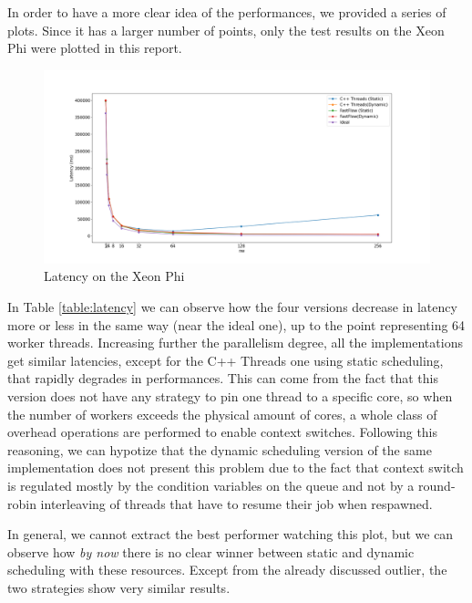 \documentclass[a4paper]{article}
\begin{document}
In order to have a more clear idea of the performances, we provided a series of plots. Since it has a larger number of points, only the test results on the Xeon Phi were plotted in this report.
 
\begin{figure}
    \centering
    \includegraphics[width=\textwidth]{plots/latency.png}
    \caption{Latency on the Xeon Phi}
    \label{fig:latency}
\end{figure}

In Table \ref{table:latency} we can observe how the four versions decrease in latency more or less in the same way (near the ideal one), up to the point representing 64 worker threads. Increasing further the parallelism degree, all the implementations get similar latencies, except for the C++ Threads one using static scheduling, that rapidly degrades in performances. This can come from the fact that this version does not have any strategy to pin one thread to a specific core, so when the number of workers exceeds the physical amount of cores, a whole class of overhead operations are performed to enable context switches. Following this reasoning, we can hypotize that the dynamic scheduling version of the same implementation does not present this problem due to the fact that context switch is regulated mostly by the condition variables on the queue and not by a round-robin interleaving of threads that have to resume their job when respawned.

In general, we cannot extract the best performer watching this plot, but we can observe how \textit{by now} there is no clear winner between static and dynamic scheduling with these resources. Except from the already discussed outlier, the two strategies show very similar results.
\end{document}
